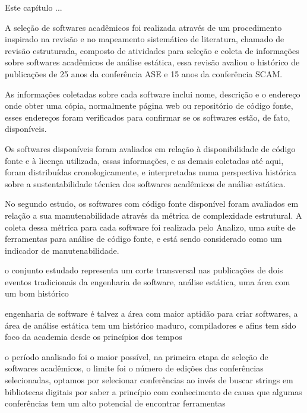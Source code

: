 {Este capítulo ... }
\label{metodologia}



A seleção de softwares acadêmicos foi realizada através de um procedimento
inspirado na revisão e no mapeamento sistemático de literatura, chamado de
revisão estruturada, composto de atividades para seleção e coleta de
informações sobre softwares acadêmicos de análise estática, essa revisão
avaliou o histórico de publicações de 25 anos da conferência ASE e 15 anos da
conferência SCAM.

As informações coletadas sobre cada software inclui nome, descrição e o
endereço onde obter uma cópia, normalmente página web ou repositório de código
fonte, esses endereços foram verificados para confirmar se os softwares estão,
de fato, disponíveis.

Os softwares disponíveis foram avaliados em relação à disponibilidade de código
fonte e à licença utilizada, essas informações, e as demais coletadas até aqui,
foram distribuídas cronologicamente, e interpretadas numa perspectiva histórica
sobre a sustentabilidade técnica dos softwares acadêmicos de análise estática.

No segundo estudo, os softwares com código fonte disponível foram avaliados em
relação a sua manutenabilidade através da métrica de complexidade estrutural. A
coleta dessa métrica para cada software foi realizada pelo Analizo, uma suíte
de ferramentas para análise de código fonte, e está sendo considerado como um
indicador de manutenabilidade.

o conjunto estudado representa um corte transversal nas
publicações de dois eventos tradicionais da engenharia
de software, análise estática, uma área com um bom histórico

engenharia de software é talvez a área com maior aptidão
para criar softwares, a área de análise estática tem um
histórico maduro, compiladores e afins tem sido foco da
academia desde os princípios dos tempos

o período analisado foi o maior possível, na primeira etapa
de seleção de softwares acadêmicos, o limite foi o número de
edições das conferências selecionadas, optamos por selecionar
conferências ao invés de buscar strings em bibliotecas digitais
por saber a princípio com conhecimento de causa que algumas
conferências tem um alto potencial de encontrar ferramentas


